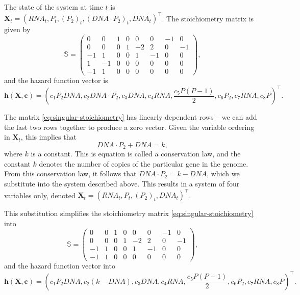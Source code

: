 The state of the system at time $t$ is $\bm{X}_t = \left(\mathit{RNA}_t, P_t, (P_2)_t, (\mathit{DNA} \cdot P_2)_t, \mathit{DNA}_t\right)^\intercal$. The stoichiometry matrix is given by
\begin{equation} \label{eq:singular-stoichiometry}
\mathbb{S} = \begin{pmatrix}
0 & 0 & 1 & 0 & 0 & 0 & -1 & 0 \\
0 & 0 & 0 & 1 & -2 & 2 & 0 & -1 \\
-1 & 1 & 0 & 0 & 1 & -1 & 0 & 0 \\
1 & -1 & 0 & 0 & 0 & 0 & 0 & 0 \\
-1 & 1 & 0 & 0 & 0 & 0 & 0 & 0
\end{pmatrix},
\end{equation}
and the hazard function vector is \citep{wilkinson}
\begin{equation*}
\bm{h}(\bm{X}, \bm{c}) = \left(c_1 P_2 \mathit{DNA}, c_2 \mathit{DNA} \cdot P_2, c_3 \mathit{DNA}, c_4 \mathit{RNA}, \frac{c_5 P(P-1)}{2}, c_6 P_2, c_7 \mathit{RNA}, c_8 P \right)^\intercal.
\end{equation*}

The matrix \eqref{eq:singular-stoichiometry} has linearly dependent rows -- we can add the last two rows together to produce a zero vector. Given the variable ordering in $\bm{X}_t$, this implies that
\begin{equation*}
\mathit{DNA} \cdot P_2 + \mathit{DNA} = k,
\end{equation*}
where $k$ is a constant. This is equation is called a conservation law, and the constant $k$ denotes the number of copies of the particular gene in the genome. From this conservation law, it follows that $\mathit{DNA} \cdot P_2 = k - \mathit{DNA}$, which we substitute into the system described above. This results in a system of four variables only, denoted ${\bm{X}_t = \left(\mathit{RNA}_t, P_t, (P_2)_t, \mathit{DNA}_t\right)^\intercal}$.

This substitution simplifies the stoichiometry matrix \eqref{eq:singular-stoichiometry} into
\begin{equation*}
\mathbb{S} = \begin{pmatrix}
0 & 0 & 1 & 0 & 0 & 0 & -1 & 0 \\
0 & 0 & 0 & 1 & -2 & 2 & 0 & -1 \\
-1 & 1 & 0 & 0 & 1 & -1 & 0 & 0 \\
-1 & 1 & 0 & 0 & 0 & 0 & 0 & 0
\end{pmatrix},
\end{equation*}
and the hazard function vector into
\begin{equation} \label{eq:ar-hazard}
\bm{h}(\bm{X}, \bm{c}) = \left(c_1 P_2 \mathit{DNA}, c_2 (k - \mathit{DNA}), c_3 \mathit{DNA}, c_4 \mathit{RNA}, \frac{c_5 P(P-1)}{2}, c_6 P_2, c_7 \mathit{RNA}, c_8 P \right)^\intercal.
\end{equation}

